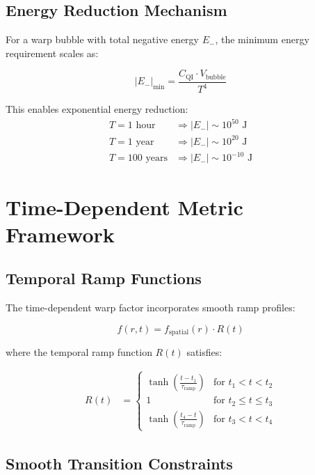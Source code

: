 \documentclass[12pt,a4paper]{article}
\begin{document}
\subsection{Energy Reduction Mechanism}

For a warp bubble with total negative energy $E_-$, the minimum energy requirement scales as:

\begin{equation}
|E_-|_{\text{min}} = \frac{C_{\text{QI}} \cdot V_{\text{bubble}}}{T^4}
\end{equation}

This enables exponential energy reduction:
\begin{align}
T = 1 \text{ hour} &\Rightarrow |E_-| \sim 10^{50} \text{ J} \\
T = 1 \text{ year} &\Rightarrow |E_-| \sim 10^{20} \text{ J} \\
T = 100 \text{ years} &\Rightarrow |E_-| \sim 10^{-10} \text{ J}
\end{align}

\section{Time-Dependent Metric Framework}

\subsection{Temporal Ramp Functions}

The time-dependent warp factor incorporates smooth ramp profiles:

\begin{equation}
f(r,t) = f_{\text{spatial}}(r) \cdot R(t)
\end{equation}

where the temporal ramp function $R(t)$ satisfies:

\begin{align}
R(t) &= \begin{cases}
\tanh\left(\frac{t - t_1}{\tau_{\text{ramp}}}\right) & \text{for } t_1 < t < t_2 \\
1 & \text{for } t_2 \leq t \leq t_3 \\
\tanh\left(\frac{t_4 - t}{\tau_{\text{ramp}}}\right) & \text{for } t_3 < t < t_4
\end{cases}
\end{align}

\subsection{Smooth Transition Constraints}
\end{document}
